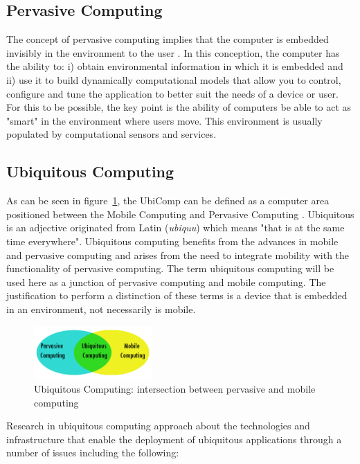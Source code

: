 \documentclass{acm_proc_article-sp}
\begin{document}
\subsection{Pervasive Computing}
The concept of pervasive computing implies that the computer is embedded invisibly in the environment to the user \cite{krumm2009}. In this conception, the computer has the ability to: i) obtain environmental information in which it is embedded and ii) use it to build dynamically computational models that allow you to control, configure and tune the application to better suit the needs of a device or user. For this to be possible, the key point is the ability of computers be able to act as "smart" in the environment where users move. This environment is usually populated by computational sensors and services.

\subsection{Ubiquitous Computing}
As can be seen in figure~\ref{fig:ubiq}, the UbiComp can be defined as a computer area positioned between the Mobile Computing and Pervasive Computing \cite{de2003computaccao,krumm2009}. Ubiquitous is an adjective originated from Latin (\textit{ubiquu}) which means "that is at the same time everywhere". Ubiquitous computing benefits from the advances in mobile and pervasive computing and arises from the need to integrate mobility with the functionality of pervasive computing. The term ubiquitous computing will be used here as a junction of pervasive computing and mobile computing. The justification to perform a distinction of these terms is a device that is embedded in an environment, not necessarily is mobile.
\begin{figure}[h]
    \includegraphics[width=0.4\textwidth,natwidth=610,natheight=642]{pictures/ubiq.png}
    \caption{Ubiquitous Computing: intersection between pervasive and mobile computing}
    \label{fig:ubiq}
\end{figure}
\newline
\newline
Research in ubiquitous computing approach about the technologies and infrastructure that enable the deployment of ubiquitous applications through a number of issues including the following:
\end{document}
